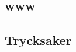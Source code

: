 \documentclass[11pt,a4paper]{article}
\begin{document}
\subsection{www}\label{interwebs}

\subsection{Trycksaker}\label{literature} %


\end{document}
